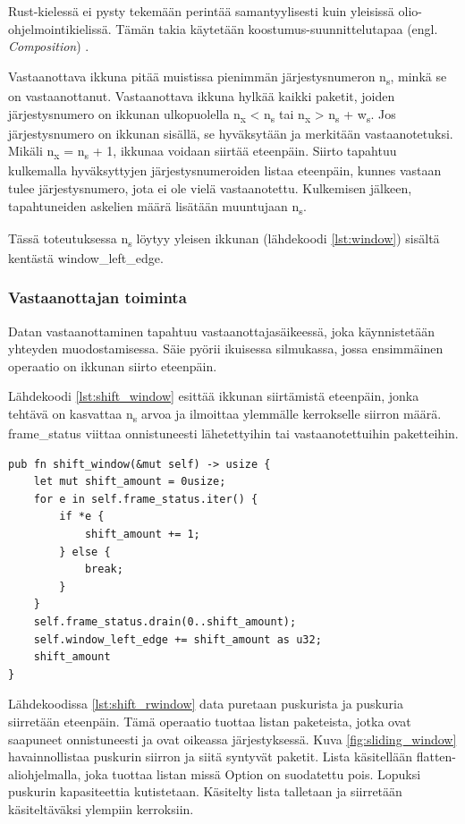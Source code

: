 \documentclass[a4paper,12pt]{article}
\begin{document}
    Rust-kielessä ei pysty tekemään perintää samantyylisesti kuin yleisissä olio-ohjelmointikielissä. Tämän takia
    käytetään koostumus-suunnittelutapaa (engl. \textit{Composition}) \cite{Ivicevic202228Rust}.

    Vastaanottava ikkuna pitää muistissa pienimmän järjestysnumeron n\textsubscript{s}, minkä se on vastaanottanut.
    Vastaanottava ikkuna hylkää kaikki paketit, joiden järjestysnumero on ikkunan ulkopuolella n\textsubscript{x} < n\textsubscript{s} tai n\textsubscript{x} > n\textsubscript{s} + w\textsubscript{s}. Jos järjestysnumero on ikkunan sisällä, se hyväksytään ja merkitään vastaanotetuksi. Mikäli n\textsubscript{x} = n\textsubscript{s} + 1, ikkunaa voidaan siirtää eteenpäin.
    Siirto tapahtuu kulkemalla hyväksyttyjen järjestysnumeroiden listaa eteenpäin, kunnes vastaan tulee järjestysnumero, jota ei ole vielä vastaanotettu. Kulkemisen jälkeen, tapahtuneiden askelien määrä lisätään muuntujaan n\textsubscript{s}.

    Tässä toteutuksessa n\textsubscript{s} löytyy yleisen ikkunan (lähdekoodi \ref{lst:window}) sisältä kentästä window\_left\_edge.


    \subsubsection*{Vastaanottajan toiminta}
    Datan vastaanottaminen tapahtuu vastaanottajasäikeessä, joka käynnistetään yhteyden muodostamisessa.
    Säie pyörii ikuisessa silmukassa, jossa ensimmäinen operaatio on ikkunan siirto eteenpäin.

    Lähdekoodi \ref{lst:shift_window} esittää ikkunan siirtämistä eteenpäin, jonka tehtävä on kasvattaa n\textsubscript{s} arvoa ja ilmoittaa ylemmälle kerrokselle siirron määrä.
    frame\_status viittaa onnistuneesti lähetettyihin tai vastaanotettuihin paketteihin.

    \begin{lstlisting}[caption={Ikkunan siirto}, label={lst:shift_window}]
pub fn shift_window(&mut self) -> usize {
    let mut shift_amount = 0usize;
    for e in self.frame_status.iter() {
        if *e {
            shift_amount += 1;
        } else {
            break;
        }
    }
    self.frame_status.drain(0..shift_amount);
    self.window_left_edge += shift_amount as u32;
    shift_amount
}\end{lstlisting}

    Lähdekoodissa \ref{lst:shift_rwindow} data puretaan puskurista ja puskuria siirretään eteenpäin. Tämä operaatio tuottaa
    listan paketeista, jotka ovat saapuneet onnistuneesti ja ovat oikeassa järjestyksessä. Kuva \ref{fig:sliding_window} havainnollistaa puskurin siirron ja siitä syntyvät paketit.
    Lista käsitellään flatten-aliohjelmalla, joka tuottaa listan missä Option
    on suodatettu pois. Lopuksi puskurin kapasiteettia kutistetaan. Käsitelty lista talletaan ja siirretään käsiteltäväksi ylempiin kerroksiin. \par
\end{document}
